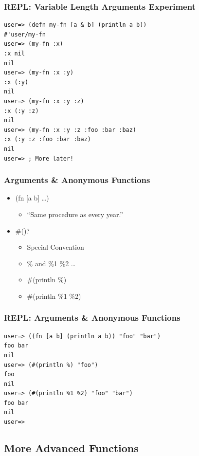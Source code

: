 \documentclass{beamer}
\begin{document}
\begin{frame}[fragile]
\frametitle{REPL: Variable Length Arguments Experiment}
\begin{lstlisting}[basicstyle=\scriptsize]
user=> (defn my-fn [a & b] (println a b))
#'user/my-fn
user=> (my-fn :x)
:x nil
nil
user=> (my-fn :x :y)
:x (:y)
nil
user=> (my-fn :x :y :z)
:x (:y :z)
nil
user=> (my-fn :x :y :z :foo :bar :baz)
:x (:y :z :foo :bar :baz)
nil
user=> ; More later! 
\end{lstlisting}
\end{frame}


  \begin{frame}
      \frametitle{Arguments \& Anonymous Functions}

      \begin{itemize}
          \item (fn [a b] \ldots)
              \begin{itemize}
                  \item ``Same procedure as every year.''
              \end{itemize}
          \item \#()?
              \begin{itemize}
                  \item Special Convention
                  \item \% and \%1 \%2 \ldots
                  \item \#(println \%)
                  \item \#(println \%1 \%2)
              \end{itemize}
      \end{itemize}
  \end{frame}

\begin{frame}[fragile]
\frametitle{REPL: Arguments \& Anonymous Functions}
\begin{lstlisting}[basicstyle=\scriptsize]
user=> ((fn [a b] (println a b)) "foo" "bar")
foo bar
nil
user=> (#(println %) "foo")
foo
nil
user=> (#(println %1 %2) "foo" "bar")
foo bar
nil
user=>  
\end{lstlisting}
\end{frame}

\subsection{More Advanced Functions}
\end{document}
